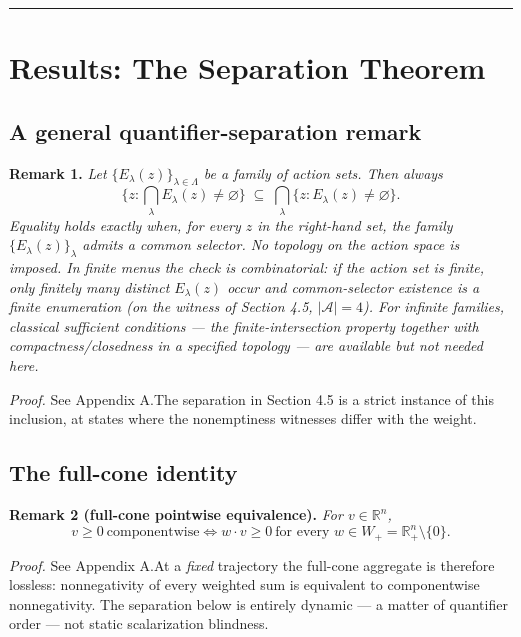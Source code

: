 \documentclass[review,11pt]{elsarticle}
\begin{document}
\begin{center}\rule{0.5\linewidth}{0.5pt}\end{center}

\section{Results: The Separation
Theorem}\label{results-the-separation-theorem}

\subsection{A general quantifier-separation
remark}\label{a-general-quantifier-separation-remark}

\textbf{Remark 1.} \emph{Let \(\{E_\lambda(z)\}_{\lambda \in \Lambda}\)
be a family of action sets. Then always}
\[\Big\{ z : \textstyle\bigcap_{\lambda} E_\lambda(z) \neq \varnothing \Big\} \;\subseteq\; \bigcap_{\lambda} \big\{ z : E_\lambda(z) \neq \varnothing \big\}.\]
\emph{Equality holds exactly when, for every \(z\) in the right-hand
set, the family \(\{E_\lambda(z)\}_\lambda\) admits a common selector.
No topology on the action space is imposed. In finite menus the check is
combinatorial: if the action set is finite, only finitely many distinct
\(E_\lambda(z)\) occur and common-selector existence is a finite
enumeration (on the witness of Section 4.5, \(|\mathcal{A}| = 4\)). For
infinite families, classical sufficient conditions --- the
finite-intersection property together with compactness/closedness in a specified topology --- are available but not needed here.}

\emph{Proof.} See Appendix A.The separation in Section 4.5 is a strict instance of this inclusion, at states where the nonemptiness witnesses differ with the weight.

\subsection{The full-cone identity}\label{the-full-cone-identity}

\textbf{Remark 2 (full-cone pointwise equivalence).} \emph{For
\(v \in \mathbb{R}^n\),}
\[v \ge 0 \ \text{componentwise} \iff w \cdot v \ge 0 \ \text{for every } w \in W_+ = \mathbb{R}^n_+ \setminus \{0\}.\]

\emph{Proof.} See Appendix A.At a \emph{fixed} trajectory the full-cone aggregate is therefore lossless: nonnegativity of every weighted sum is equivalent to componentwise nonnegativity. The separation below is entirely dynamic --- a matter of quantifier order --- not static scalarization blindness.
\end{document}
